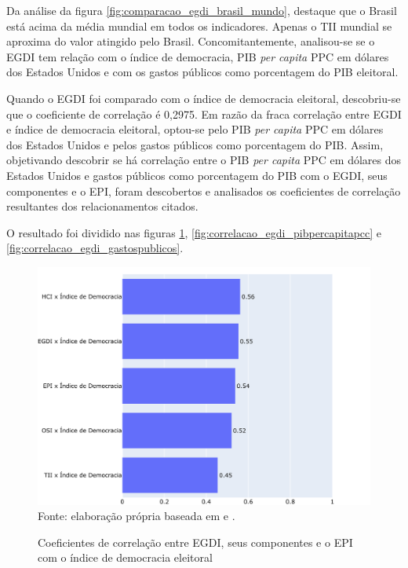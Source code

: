 Da análise da figura \ref{fig:comparacao_egdi_brasil_mundo}, destaque que o Brasil está acima da média mundial em todos os indicadores. Apenas o TII mundial se aproxima do valor atingido pelo Brasil. Concomitantemente, analisou-se se o EGDI tem relação com o índice de democracia, PIB \textit{per capita} PPC em dólares dos Estados Unidos e com os gastos públicos como porcentagem do PIB eleitoral.

Quando o EGDI foi comparado com o índice de democracia eleitoral, descobriu-se que o coeficiente de correlação é 0,2975. Em razão da fraca correlação entre EGDI e índice de democracia eleitoral, optou-se pelo PIB \textit{per capita} PPC em dólares dos Estados Unidos e pelos gastos públicos como porcentagem do PIB. Assim, objetivando descobrir se há correlação entre o PIB \textit{per capita} PPC em dólares dos Estados Unidos e gastos públicos como porcentagem do PIB com o EGDI, seus componentes e o EPI, foram descobertos e analisados os coeficientes de correlação resultantes dos relacionamentos citados.

O resultado foi dividido nas figuras \ref{fig:correlacao_egdi_indicedemocraciaeleitoral}, \ref{fig:correlacao_egdi_pibpercapitapcc} e \ref{fig:correlacao_egdi_gastospublicos}.

\begin{figure}[H]
	\centering
	\caption{Coeficientes de correlação entre EGDI, seus componentes e o EPI com o índice de democracia eleitoral}
	\includegraphics[width=1\linewidth]{figuras/correlacao_egdi_indicedemocraciaeleitoral.png}
	\label{fig:correlacao_egdi_indicedemocraciaeleitoral}
	\footnotesize{Fonte: elaboração própria baseada em \cite{electoral-democracy-index} e \cite{ONU_EGDI_dados}.}
\end{figure}

